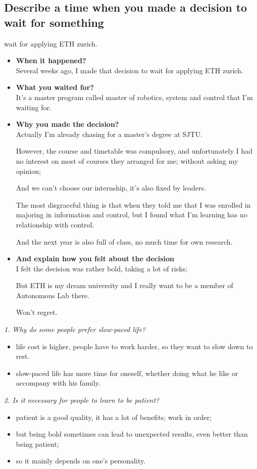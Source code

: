 \documentclass[conference]{IEEEtran}
\begin{document}
\subsection{Describe a time when you made a decision to wait for something}
wait for applying ETH zurich.
\begin{itemize}
    \item \textbf{When it happened?}\\
    Several weeks ago, I made that decision to wait for applying ETH zurich. 
    \item \textbf{What you waited for?}\\
    It's a master program called master of robotics, system and control that I'm waiting for.
    \item \textbf{Why you made the decision?}\\
    Actually I'm already chasing for a master's degree at SJTU.

    However, the course and timetable was compulsory, and unfortunately I had no interest on most of courses they arranged for me;
    without asking my opinion;

    And we can't choose our internship, it's also fixed by leaders.

    The most disgraceful thing is that when they told me that I was enrolled in majoring in information and control,
    but I found what I'm learning has no relationship with control.

    And the next year is also full of class, no much time for own research.
    \item \textbf{And explain how you felt about the decision}\\
    I felt the decision was rather bold, taking a lot of risks;

    But ETH is my dream university and I really want to be a member of Autonomous Lab there.

    Won't regret.
\end{itemize}

\textit{1. Why do some people prefer slow-paced life?}
\begin{itemize}
    \item life cost is higher, people have to work harder, so they want to slow down to rest.
    \item slow-paced life has more time for oneself, whether doing what he like or accompany with his family.
\end{itemize}

\textit{2. Is it necessary for people to learn to be patient?}
\begin{itemize}
    \item patient is a good quality, it has a lot of benefits; work in order;
    \item but being bold sometimes can lead to unexpected results, even better than being patient;
    \item so it mainly depends on one's personality.
\end{itemize}
\end{document}
